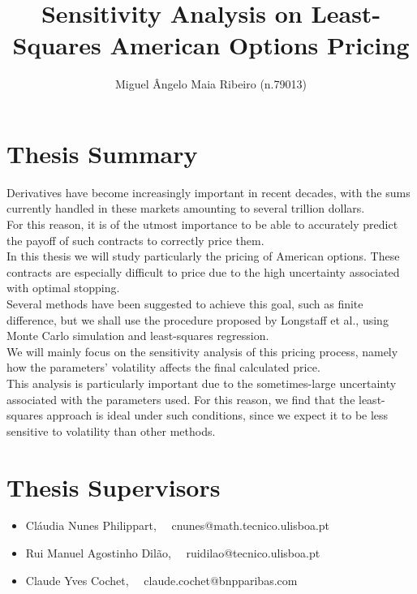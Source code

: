 \documentclass[a4paper,prd,nofootinbib,superscriptaddress,floatfix]{revtex4}
\begin{document}
\title{Sensitivity Analysis on Least-Squares American Options Pricing}

\author{Miguel Ângelo Maia Ribeiro (n.79013)}




\maketitle
\section{Thesis Summary}
\noindent Derivatives have become increasingly important in recent decades, with the sums currently handled in these markets amounting to several trillion dollars.\\
For this reason, it is of the utmost importance to be able to accurately predict the payoff of such contracts to correctly price them.\\
In this thesis we will study particularly the pricing of American options. These contracts are especially difficult to price due to the high uncertainty associated with optimal stopping.\\
Several methods have been suggested to achieve this goal, such as finite difference, but we shall use the procedure proposed by Longstaff et al., using Monte Carlo simulation and least-squares regression.\\
We will mainly focus on the sensitivity analysis of this pricing process, namely how the parameters’ volatility affects the final calculated price.\\
This analysis is particularly important due to the sometimes-large uncertainty associated with the parameters used. For this reason, we find that the least-squares approach is ideal under such conditions, since we expect it to be less sensitive to volatility than other methods.


\section{Thesis Supervisors}
\begin{itemize}
  \item Cláudia Nunes Philippart, \ \ cnunes@math.tecnico.ulisboa.pt
  \item Rui Manuel Agostinho Dilão, \ \ ruidilao@tecnico.ulisboa.pt
  \item Claude Yves Cochet, \ \ claude.cochet@bnpparibas.com
\end{itemize}
\end{document}
